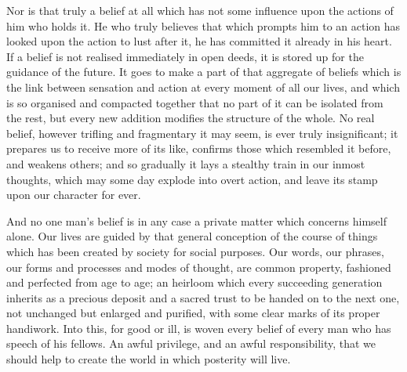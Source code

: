\documentclass[12pt]{article}
\begin{document}
Nor is that truly a belief at all which has not some influence upon the actions of him who holds it. He who truly believes that which prompts him to an action has looked upon the action to lust after it, he has committed it already in his heart. If a belief is not realised immediately in open deeds, it is stored up for the guidance of the future. It goes to make a part of that aggregate of beliefs which is the link between sensation and action at every moment of all our lives, and which is so organised and compacted together that no part of it can be isolated from the rest, but every new addition modifies the structure of the whole. No real belief, however trifling and fragmentary it may seem, is ever truly insignificant; it prepares us to receive more of its like, confirms those which resembled it before, and weakens others; and so gradually it lays a stealthy train in our inmost thoughts, which may some day explode into overt action, and leave its stamp upon our character for ever.

And no one man's belief is in any case a private matter which concerns himself alone. Our lives are guided by that general conception of the course of things which has been created by society for social purposes. Our words, our phrases, our forms and processes and modes of thought, are common property, fashioned and perfected from age to age; an heirloom which every succeeding generation inherits as a precious deposit and a sacred trust to be handed on to the next one, not unchanged but enlarged and purified, with some clear marks of its proper handiwork. Into this, for good or ill, is woven every belief of every man who has speech of his fellows. An awful privilege, and an awful responsibility, that we should help to create the world in which posterity will live.
\end{document}
